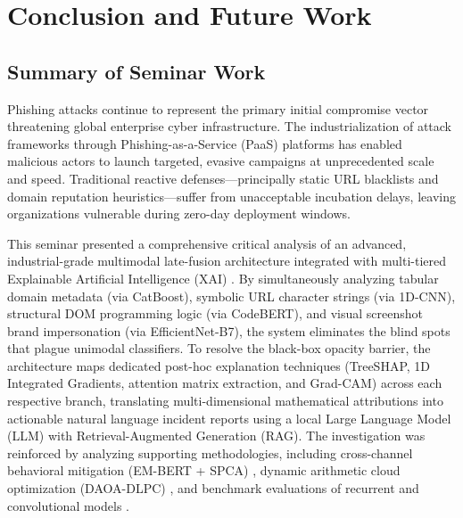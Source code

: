 \chapter{Conclusion and Future Work}

\section{Summary of Seminar Work}
Phishing attacks continue to represent the primary initial compromise vector threatening global enterprise cyber infrastructure. The industrialization of attack frameworks through Phishing-as-a-Service (PaaS) platforms has enabled malicious actors to launch targeted, evasive campaigns at unprecedented scale and speed. Traditional reactive defenses---principally static URL blacklists and domain reputation heuristics---suffer from unacceptable incubation delays, leaving organizations vulnerable during zero-day deployment windows.

This seminar presented a comprehensive critical analysis of an advanced, industrial-grade multimodal late-fusion architecture integrated with multi-tiered Explainable Artificial Intelligence (XAI) \cite{1}. By simultaneously analyzing tabular domain metadata (via CatBoost), symbolic URL character strings (via 1D-CNN), structural DOM programming logic (via CodeBERT), and visual screenshot brand impersonation (via EfficientNet-B7), the system eliminates the blind spots that plague unimodal classifiers. To resolve the black-box opacity barrier, the architecture maps dedicated post-hoc explanation techniques (TreeSHAP, 1D Integrated Gradients, attention matrix extraction, and Grad-CAM) across each respective branch, translating multi-dimensional mathematical attributions into actionable natural language incident reports using a local Large Language Model (LLM) with Retrieval-Augmented Generation (RAG). The investigation was reinforced by analyzing supporting methodologies, including cross-channel behavioral mitigation (EM-BERT + SPCA) \cite{2}, dynamic arithmetic cloud optimization (DAOA-DLPC) \cite{3}, and benchmark evaluations of recurrent and convolutional models \cite{4}.


